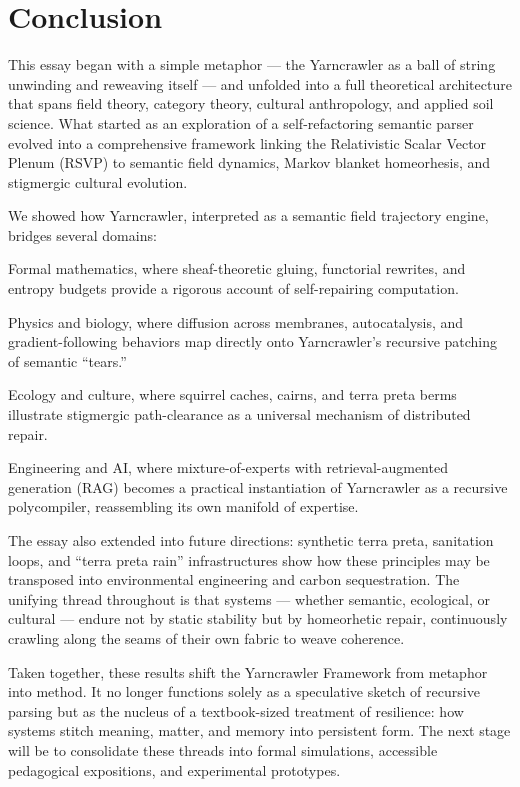 \documentclass{article}
\begin{document}
\section{Conclusion}

This essay began with a simple metaphor — the Yarncrawler as a ball of string unwinding and reweaving itself — and unfolded into a full theoretical architecture that spans field theory, category theory, cultural anthropology, and applied soil science. What started as an exploration of a self-refactoring semantic parser evolved into a comprehensive framework linking the Relativistic Scalar Vector Plenum (RSVP) to semantic field dynamics, Markov blanket homeorhesis, and stigmergic cultural evolution.

We showed how Yarncrawler, interpreted as a semantic field trajectory engine, bridges several domains:

Formal mathematics, where sheaf-theoretic gluing, functorial rewrites, and entropy budgets provide a rigorous account of self-repairing computation.

Physics and biology, where diffusion across membranes, autocatalysis, and gradient-following behaviors map directly onto Yarncrawler’s recursive patching of semantic “tears.”

Ecology and culture, where squirrel caches, cairns, and terra preta berms illustrate stigmergic path-clearance as a universal mechanism of distributed repair.

Engineering and AI, where mixture-of-experts with retrieval-augmented generation (RAG) becomes a practical instantiation of Yarncrawler as a recursive polycompiler, reassembling its own manifold of expertise.


The essay also extended into future directions: synthetic terra preta, sanitation loops, and “terra preta rain” infrastructures show how these principles may be transposed into environmental engineering and carbon sequestration. The unifying thread throughout is that systems — whether semantic, ecological, or cultural — endure not by static stability but by homeorhetic repair, continuously crawling along the seams of their own fabric to weave coherence.

Taken together, these results shift the Yarncrawler Framework from metaphor into method. It no longer functions solely as a speculative sketch of recursive parsing but as the nucleus of a textbook-sized treatment of resilience: how systems stitch meaning, matter, and memory into persistent form. The next stage will be to consolidate these threads into formal simulations, accessible pedagogical expositions, and experimental prototypes.
\end{document}

